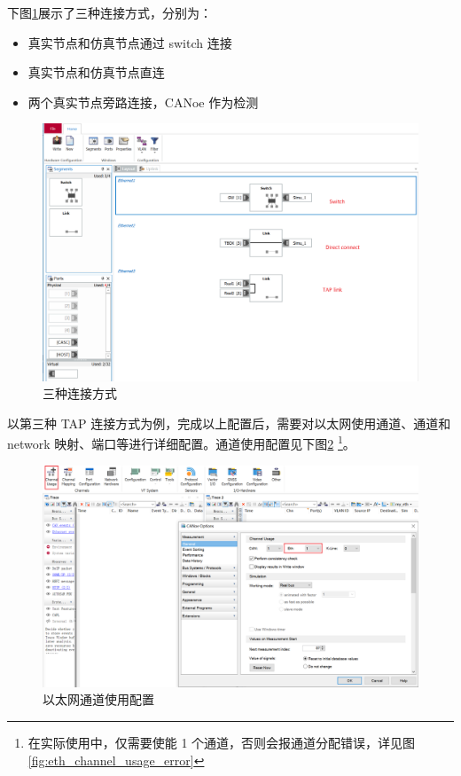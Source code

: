 下图\ref{fig:three_connect_ways}展示了三种连接方式，分别为：
\begin{itemize}
    \item 真实节点和仿真节点通过 switch 连接
    \item 真实节点和仿真节点直连
    \item 两个真实节点旁路连接，CANoe 作为检测
\end{itemize}

\begin{figure}[!ht]
    \centering
    \includegraphics[scale=0.5]{pic/Snipaste_2021-10-29_15-06-06.png}
    \caption{三种连接方式}
    \label{fig:three_connect_ways}
\end{figure}

以第三种 TAP 连接方式为例，完成以上配置后，需要对以太网使用通道、通道和 network 映射、端口等进行详细配置。通道使用配置见下图\ref{fig:eth_channel_usage} \footnote{在实际使用中，仅需要使能 1 个通道，否则会报通道分配错误，详见图\ref{fig:eth_channel_usage_error}}。

\begin{figure}[ht]
    \centering
    \includegraphics[scale=0.5]{pic/Snipaste_2021-10-29_15-18-52.png}
    \caption{以太网通道使用配置}
    \label{fig:eth_channel_usage}
\end{figure}

